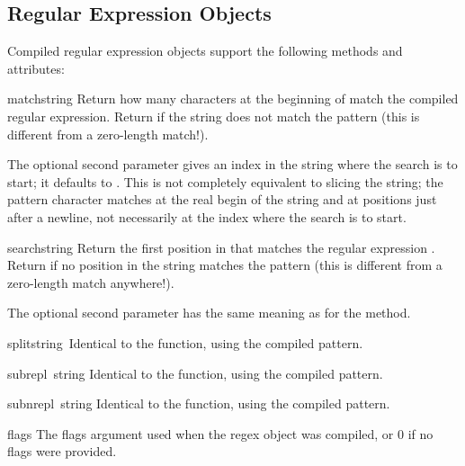 \subsection{Regular Expression Objects}
Compiled regular expression objects support the following methods and
attributes:

\renewcommand{\indexsubitem}{(regex method)}
\begin{funcdesc}{match}{string}
  Return how many characters at the beginning of  match
  the compiled regular expression.  Return  if the string
  does not match the pattern (this is different from a zero-length
  match!).
  
  The optional second parameter  gives an index in the string
  where the search is to start; it defaults to .  This is not
  completely equivalent to slicing the string; the  pattern
  character matches at the real begin of the string and at positions
  just after a newline, not necessarily at the index where the search
  is to start.
\end{funcdesc}

\begin{funcdesc}{search}{string}
  Return the first position in  that matches the regular
  expression .  Return  if no position in the
  string matches the pattern (this is different from a zero-length
  match anywhere!).
  
  The optional second parameter has the same meaning as for the
   method.
\end{funcdesc}

\begin{funcdesc}{split}{string\, }
Identical to the  function, using the compiled pattern.
\end{funcdesc}

\begin{funcdesc}{sub}{repl\, string}
Identical to the  function, using the compiled pattern.
\end{funcdesc}

\begin{funcdesc}{subn}{repl\, string}
Identical to the  function, using the compiled pattern.
\end{funcdesc}

\renewcommand{\indexsubitem}{(regex attribute)}

\begin{datadesc}{flags}
The flags argument used when the regex object was compiled, or 0 if no
flags were provided.
\end{datadesc}

